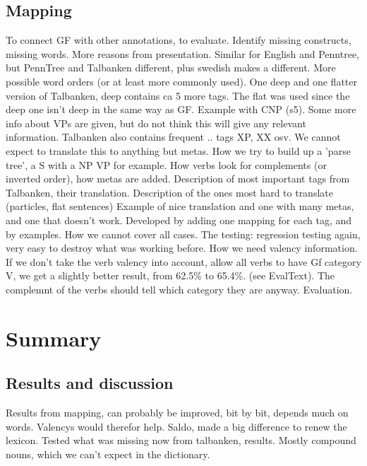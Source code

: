 \documentclass{report}
\begin{document}
\section{Mapping}
To connect GF with other annotations, to evaluate. Identify missing constructs,
missing words. More reasons from presentation.
Similar for English and Penntree, but PennTree and Talbanken different, plus swedish
makes a different. More possible word orders (or at least more commonly used).
One deep and one flatter version of Talbanken, deep contains ca 5 more tags.
The flat was used since the deep one
isn't deep in the same way as GF. Example with CNP (s5). Some
more info about VPs are given, but do not think this will give any relevant information.
Talbanken also contains frequent .. tags XP, XX osv. We cannot expect to translate
this to anything but metas.
How we try to build up a 'parse tree', a S with a NP VP for example. 
How verbs look for complements (or inverted order), how metas are added.
Description of most important tags from Talbanken, their translation.
Description of the ones most hard to translate (particles, flat sentences)
Example of nice translation and one with many metas, and one that doesn't work.
Developed by adding one mapping for each tag, and by examples.
How we cannot cover all cases. The testing: regression testing again,
very easy to destroy what was working before. 
How we need valency information.
If we don't take the verb valency into account, allow all verbs to have Gf category V,
we get a slightly better result,
from 62.5\% to 65.4\%.  (see EvalText). The complemnt of the verbs should tell which category
they are anyway.
Evaluation. 



\chapter{Summary}
\section{Results and discussion}
Results from mapping, can probably be improved, bit by bit, depends much on words.
Valencys would therefor help.  
Saldo, made a big difference to renew the lexicon. Tested what was missing now from talbanken,
results. Mostly compound nouns, which we can't expect in the dictionary.
\end{document}
